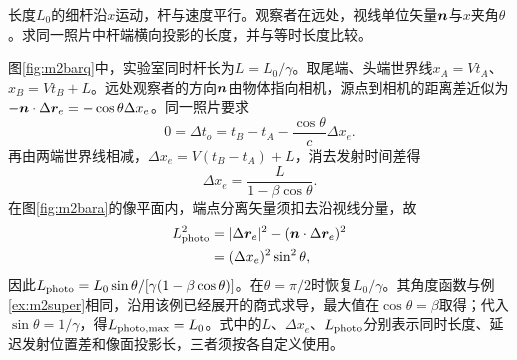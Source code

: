 \begin{exercise}\label{ex:m2imagebar}
长度$L_0$的细杆沿$x$运动，杆与速度平行。观察者在远处，视线单位矢量$\bm{n}$与$x$夹角$\theta$。求同一照片中杆端横向投影的长度，并与等时长度比较。
\end{exercise}
\begin{solution}
图\ref{fig:m2barq}中，实验室同时杆长为$L=L_0/\gamma$。取尾端、头端世界线$x_A=Vt_A$、$x_B=Vt_B+L$。远处观察者的方向$\bm{n}$由物体指向相机，源点到相机的距离差近似为$-\bm{n}\cdot\Delta\bm{r}_e=-\cos\theta\Delta x_e$。同一照片要求
\[
 0=\Delta t_o=t_B-t_A-\frac{\cos\theta}{c}\Delta x_e.
\]
再由两端世界线相减，$\Delta x_e=V(t_B-t_A)+L$，消去发射时间差得
\[
 \Delta x_e=\frac{L}{1-\beta\cos\theta}.
\]
在图\ref{fig:m2bara}的像平面内，端点分离矢量须扣去沿视线分量，故
\begin{align*}
 L_{\rm photo}^2
 &=|\Delta\bm{r}_e|^2-(\bm{n}\cdot\Delta\bm{r}_e)^2\\
 &=(\Delta x_e)^2\sin^2\theta,
\end{align*}
因此$L_{\rm photo}=L_0\sin\theta/[\gamma(1-\beta\cos\theta)]$。在$\theta=\pi/2$时恢复$L_0/\gamma$。其角度函数与例\ref{ex:m2super}相同，沿用该例已经展开的商式求导，最大值在$\cos\theta=\beta$取得；代入$\sin\theta=1/\gamma$，得$L_{\rm photo,max}=L_0$。式中的$L$、$\Delta x_e$、$L_{\rm photo}$分别表示同时长度、延迟发射位置差和像面投影长，三者须按各自定义使用。
\end{solution}
